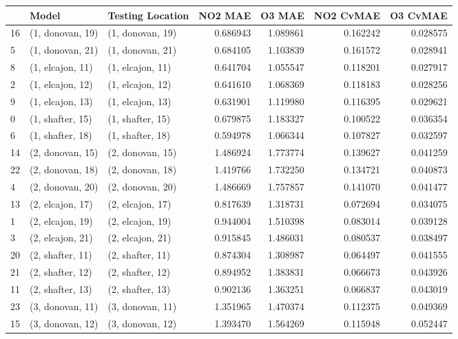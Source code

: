 \begin{tabular}{lllrrrr}
\toprule
{} &             Model &  Testing Location &   NO2 MAE &    O3 MAE &  NO2 CvMAE &  O3 CvMAE \\
\midrule
16 &  (1, donovan, 19) &  (1, donovan, 19) &  0.686943 &  1.089861 &   0.162242 &  0.028575 \\
5  &  (1, donovan, 21) &  (1, donovan, 21) &  0.684105 &  1.103839 &   0.161572 &  0.028941 \\
8  &  (1, elcajon, 11) &  (1, elcajon, 11) &  0.641704 &  1.055547 &   0.118201 &  0.027917 \\
2  &  (1, elcajon, 12) &  (1, elcajon, 12) &  0.641610 &  1.068369 &   0.118183 &  0.028256 \\
9  &  (1, elcajon, 13) &  (1, elcajon, 13) &  0.631901 &  1.119980 &   0.116395 &  0.029621 \\
0  &  (1, shafter, 15) &  (1, shafter, 15) &  0.679875 &  1.183327 &   0.100522 &  0.036354 \\
6  &  (1, shafter, 18) &  (1, shafter, 18) &  0.594978 &  1.066344 &   0.107827 &  0.032597 \\
14 &  (2, donovan, 15) &  (2, donovan, 15) &  1.486924 &  1.773774 &   0.139627 &  0.041259 \\
22 &  (2, donovan, 18) &  (2, donovan, 18) &  1.419766 &  1.732250 &   0.134721 &  0.040873 \\
4  &  (2, donovan, 20) &  (2, donovan, 20) &  1.486669 &  1.757857 &   0.141070 &  0.041477 \\
13 &  (2, elcajon, 17) &  (2, elcajon, 17) &  0.817639 &  1.318731 &   0.072694 &  0.034075 \\
1  &  (2, elcajon, 19) &  (2, elcajon, 19) &  0.944004 &  1.510398 &   0.083014 &  0.039128 \\
3  &  (2, elcajon, 21) &  (2, elcajon, 21) &  0.915845 &  1.486031 &   0.080537 &  0.038497 \\
20 &  (2, shafter, 11) &  (2, shafter, 11) &  0.874304 &  1.308987 &   0.064497 &  0.041555 \\
21 &  (2, shafter, 12) &  (2, shafter, 12) &  0.894952 &  1.383831 &   0.066673 &  0.043926 \\
11 &  (2, shafter, 13) &  (2, shafter, 13) &  0.902136 &  1.363251 &   0.066837 &  0.043019 \\
23 &  (3, donovan, 11) &  (3, donovan, 11) &  1.351965 &  1.470374 &   0.112375 &  0.049369 \\
15 &  (3, donovan, 12) &  (3, donovan, 12) &  1.393470 &  1.564269 &   0.115948 &  0.052447 \\

\end{tabular}
